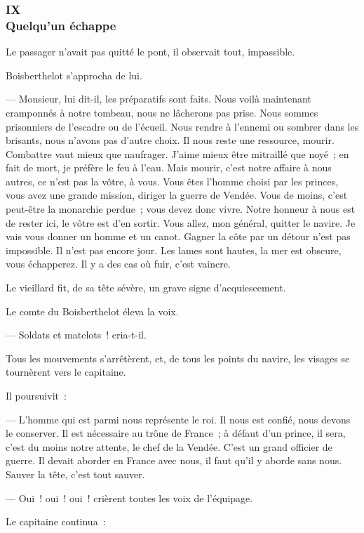 \documentclass[french,twoside]{book} %
\begin{document}
 \subsubsection[{IX. Quelqu’un échappe}]{IX \\
Quelqu’un échappe}
\label{p1l2c9}
\noindent Le passager n’avait pas quitté le pont, il observait tout, impassible.\par
Boisberthelot s’approcha de lui.\par
— Monsieur, lui dit-il, les préparatifs sont faits. Nous voilà maintenant cramponnés à notre tombeau, nous ne lâcherons pas prise. Nous sommes prisonniers de l’escadre ou de l’écueil. Nous rendre à l’ennemi ou sombrer dans les brisants, nous n’avons pas d’autre choix. Il nous reste une ressource, mourir. Combattre vaut mieux que naufrager. J’aime mieux être mitraillé que noyé ; en fait de mort, je préfère le feu à l’eau. Mais mourir, c’est notre affaire à nous autres, ce n’est pas la vôtre, à vous. Vous êtes l’homme choisi par les princes, vous avez une grande mission, diriger la guerre de Vendée. Vous de moins, c’est peut-être la monarchie perdue ; vous devez donc vivre. Notre honneur à nous est de rester ici, le vôtre est d’en sortir. Vous allez, mon général, quitter le navire. Je vais vous donner un homme et un canot. Gagner la côte par un détour n’est pas impossible. Il n’est pas encore jour.  Les lames sont hautes, la mer est obscure, vous échapperez. Il y a des cas où fuir, c’est vaincre.\par
Le vieillard fit, de sa tête sévère, un grave signe d’acquiescement.\par
Le comte du Boisberthelot éleva la voix.\par
— Soldats et matelots ! cria-t-il.\par
Tous les mouvements s’arrêtèrent, et, de tous les points du navire, les visages se tournèrent vers le capitaine.\par
Il poursuivit :\par
— L’homme qui est parmi nous représente le roi. Il nous est confié, nous devons le conserver. Il est nécessaire au trône de France ; à défaut d’un prince, il sera, c’est du moins notre attente, le chef de la Vendée. C’est un grand officier de guerre. Il devait aborder en France avec nous, il faut qu’il y aborde sans nous. Sauver la tête, c’est tout sauver.\par
— Oui ! oui ! oui ! crièrent toutes les voix de l’équipage.\par
Le capitaine continua :\par
\end{document}
